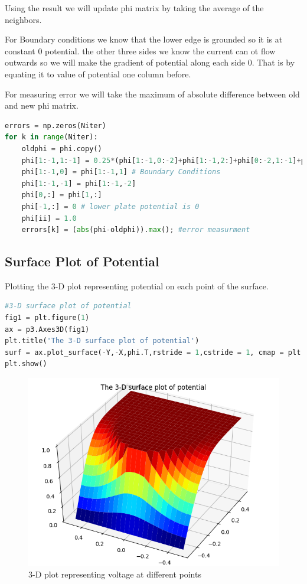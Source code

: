 \documentclass[a4paper]{article}
\begin{document}
Using the result we will update phi matrix by taking the average of the neighbors.

For Boundary conditions we know that the lower edge is grounded so it is at constant 0 potential.
the other three sides we know the current can ot flow outwards so we will make the gradient of potential along each side 0. That is by equating it to value of potential one column before. 

For measuring error we will take the maximum of absolute difference between old and new phi matrix.
\begin{lstlisting}[language=Python]
errors = np.zeros(Niter)
for k in range(Niter):
	oldphi = phi.copy()
	phi[1:-1,1:-1] = 0.25*(phi[1:-1,0:-2]+phi[1:-1,2:]+phi[0:-2,1:-1]+phi[2:,1:-1]) #updating potential as mean of its neighbors
	phi[1:-1,0] = phi[1:-1,1] # Boundary Conditions
	phi[1:-1,-1] = phi[1:-1,-2]
	phi[0,:] = phi[1,:]
	phi[-1,:] = 0 # lower plate potential is 0
	phi[ii] = 1.0		
	errors[k] = (abs(phi-oldphi)).max(); #error measurment 
\end{lstlisting}

\subsection{Surface Plot of Potential}
Plotting the 3-D plot representing potential on each point of the surface.
\begin{lstlisting}[language=Python]
#3-D surface plot of potential
fig1 = plt.figure(1)
ax = p3.Axes3D(fig1)
plt.title('The 3-D surface plot of potential')
surf = ax.plot_surface(-Y,-X,phi.T,rstride = 1,cstride = 1, cmap = plt.cm.jet)
plt.show()

\end{lstlisting}
\begin{figure}
\caption{3-D plot representing voltage at different points}
\includegraphics{Figure_1-3.png}
\end{figure}
\end{document}
